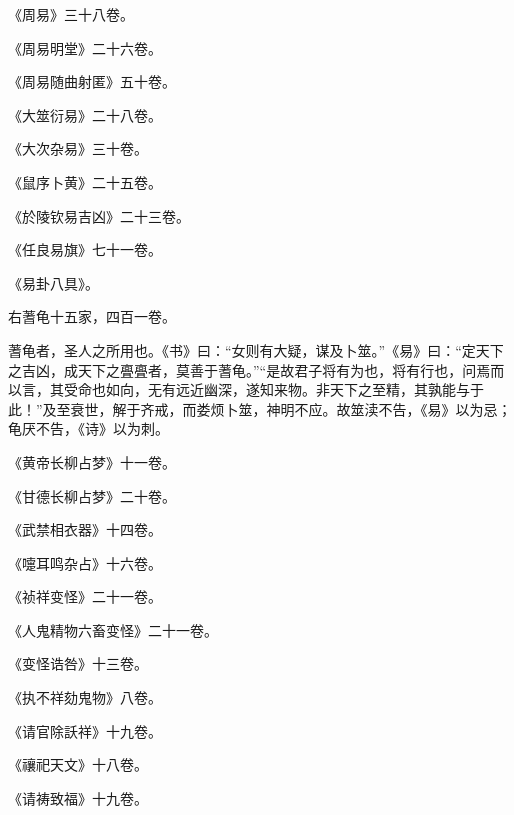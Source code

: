 \documentclass[12pt,UTF8]{ctexbook}
\begin{document}
《周易》三十八卷。



《周易明堂》二十六卷。



《周易随曲射匿》五十卷。



《大筮衍易》二十八卷。



《大次杂易》三十卷。



《鼠序卜黄》二十五卷。



《於陵钦易吉凶》二十三卷。



《任良易旗》七十一卷。



《易卦八具》。



右蓍龟十五家，四百一卷。



蓍龟者，圣人之所用也。《书》曰：“女则有大疑，谋及卜筮。”《易》曰：“定天下之吉凶，成天下之亹亹者，莫善于蓍龟。”“是故君子将有为也，将有行也，问焉而以言，其受命也如向，无有远近幽深，遂知来物。非天下之至精，其孰能与于此！”及至衰世，解于齐戒，而娄烦卜筮，神明不应。故筮渎不告，《易》以为忌；龟厌不告，《诗》以为刺。



《黄帝长柳占梦》十一卷。



《甘德长柳占梦》二十卷。



《武禁相衣器》十四卷。



《嚏耳鸣杂占》十六卷。



《祯祥变怪》二十一卷。



《人鬼精物六畜变怪》二十一卷。



《变怪诰咎》十三卷。



《执不祥劾鬼物》八卷。



《请官除訞祥》十九卷。



《禳祀天文》十八卷。



《请祷致福》十九卷。
\end{document}
